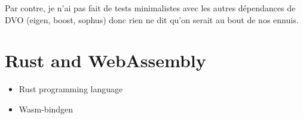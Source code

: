 Par contre, je n’ai pas fait de tests minimalistes avec les autres dépendances de DVO (eigen, boost, sophus) donc rien ne dit qu’on serait au bout de nos ennuis.

\section{Rust and WebAssembly}%
\label{sec:rust_wasm}

\begin{itemize}
	\item Rust programming language
	\item Wasm-bindgen
\end{itemize}
